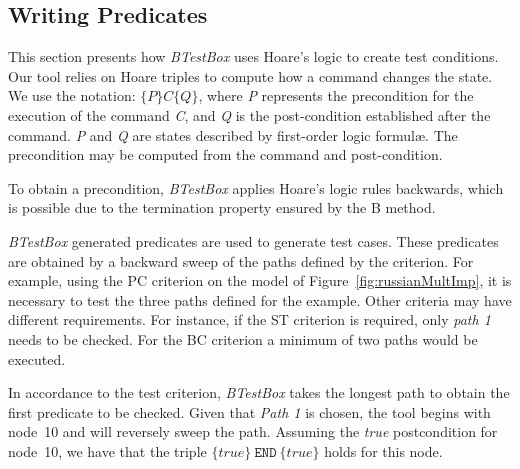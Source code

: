 \documentclass[runningheads]{llncs}
\begin{document}
\subsection{Writing Predicates} \label{writingPredicates}

This section presents how \textit{BTestBox} uses Hoare's logic to create test conditions. 
Our tool relies on Hoare triples to compute how a command changes the state. 
We use the notation: $\{P\} C \{Q\}$, where
\textit{P} represents the precondition for the execution of the command \textit{C}, and \textit{Q} is the post-condition established after the command. 
\textit{P} and \textit{Q} are states described by first-order logic formul\ae. 
The precondition may be computed from the command and post-condition. 

To obtain a precondition, \textit{BTestBox} applies Hoare's logic rules backwards, which is possible due to the termination property ensured by the B method. 


\textit{BTestBox} generated predicates are used to generate test cases. 
These predicates are obtained by a backward sweep of the paths defined by the criterion. 
For example, using the PC criterion on the model of Figure~\ref{fig:russianMultImp}, it is necessary to test the three paths defined for the example. 
Other criteria may have different requirements.
For instance, if the ST criterion is required, only \textit{path 1} needs to be checked.
For the BC criterion a minimum of two paths would be executed.

In accordance to the test criterion, \textit{BTestBox} takes the longest path to obtain the first predicate to be checked. 
Given that \textit{Path 1} is chosen, the tool begins with node~10 and will reversely sweep the path.
Assuming the \textit{true} postcondition for node~10, we have that the triple $\{true\}\ \texttt{END}\ \{true\}$ holds for this node.
\end{document}
